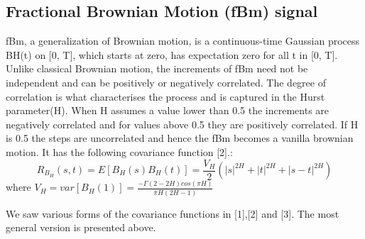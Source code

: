 \documentclass[a4paper]{article}
\begin{document}
\subsection{Fractional Brownian Motion (fBm) signal}
fBm, a generalization of Brownian motion, is a continuous-time Gaussian process BH(t) on [0, T], which starts at zero, has expectation zero for all t in [0, T]​.
​Unlike classical Brownian motion, the increments of fBm need not be independent and can be positively or negatively correlated. The degree of correlation is what characterises the process and is captured in the Hurst parameter(H). When H assumes a value lower than 0.5 the increments are negatively correlated and for values above 0.5 they are positively correlated. If H is 0.5 the steps are uncorrelated and hence the fBm becomes a vanilla brownian motion.
It has the following covariance function [2].:
$$R_{B_H}(s,t)=E[B_H(s)B_H(t)]=\frac{V_H}{2}(|s|^{2H}+|t|^{2H}+|s-t|^{2H})$$
where $V_H=var[B_H(1)]=\frac{-\Gamma(2-2H)cos(\pi H)}{\pi H(2H-1)}$

We saw various forms of the covariance functions in [1],[2] and [3]. The most general version is presented above. 
\end{document}

